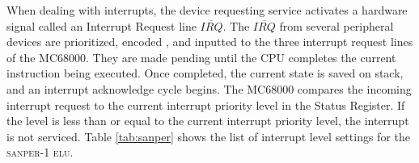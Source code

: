 \documentclass[12pt,Letter]{article}
\newcommand{\sanper}{\textsc{sanper-1 elu}}
\begin{document}
\begin{table}[H]
	\noindent{}
	\caption{Interrupt Request/Mask Relationship}
	\label{tab:mask}
\end{table}

\noindent When dealing with interrupts, the device requesting service activates a hardware signal called an Interrupt Request line $\overline{IRQ}$. The $\overline{IRQ}$ from several peripheral devices are prioritized, encoded , and inputted to the three interrupt request lines of the MC68000. They are made pending until the CPU completes the current instruction being executed. Once completed, the current state is saved on stack, and an interrupt acknowledge cycle begins. The MC68000 compares the incoming interrupt request to the current interrupt priority level in the Status Register. If the level is less than or equal to the current interrupt priority level, the interrupt is not serviced. Table \ref{tab:sanper} shows the list of interrupt level settings for the \sanper \cite{expman}.
\end{document}
